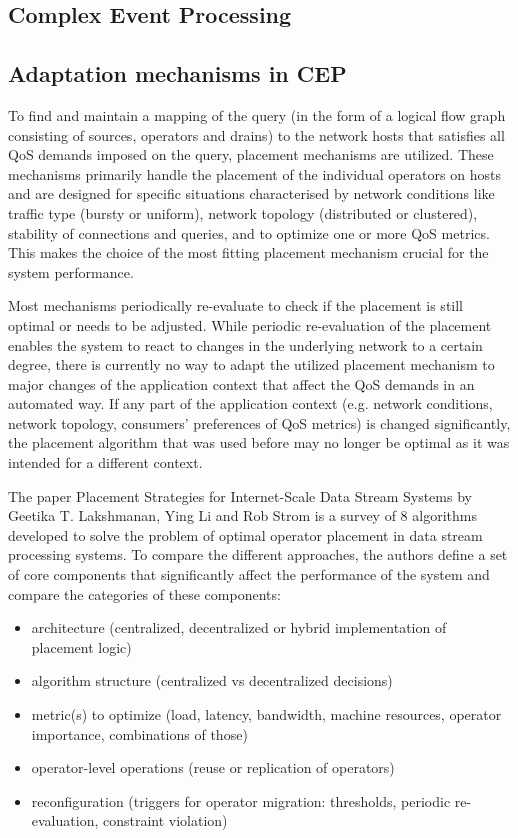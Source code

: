 \subsection{Complex Event Processing}

\subsection{Adaptation mechanisms in CEP}

To find and maintain a mapping of the query (in the form of a logical flow graph consisting of sources, operators and drains) to the network hosts that satisfies all QoS demands imposed on the query, placement mechanisms are utilized. 
These mechanisms primarily handle the placement of the individual operators on hosts and are designed  for specific situations characterised by network conditions like traffic type (bursty or uniform), network topology (distributed or clustered), stability of connections and queries, and to optimize one or more QoS metrics. This makes the choice of the most fitting placement mechanism crucial for the system performance. 

Most mechanisms periodically re-evaluate to check if the placement is still optimal or needs to be adjusted. While periodic re-evaluation of the placement enables the system to react to changes in the underlying network to a certain degree, there is currently no way to adapt the utilized placement mechanism to major changes of the application context that affect the QoS demands in an automated way.
If any part of the application context (e.g. network conditions, network topology, consumers' preferences of QoS metrics) is changed significantly, the placement algorithm that was used before may no longer be optimal as it was intended for a different context.

The paper Placement Strategies for Internet-Scale Data Stream Systems  by Geetika T. Lakshmanan, Ying Li and Rob Strom is a survey of 8 algorithms developed to solve the problem of optimal operator placement in data stream processing systems. To compare the different approaches, the authors define a set of core components that significantly affect the performance of the system and compare the categories of these components: 

\begin{itemize}
\item architecture (centralized, decentralized or hybrid implementation of placement logic)
\item algorithm structure (centralized vs decentralized decisions)
\item metric(s) to optimize (load, latency, bandwidth, machine resources, operator importance, combinations of those)
\item operator-level operations (reuse or replication of operators) 
\item reconfiguration (triggers for operator migration: thresholds, periodic re-evaluation, constraint violation)
\end{itemize}

